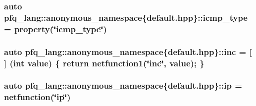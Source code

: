 \hypertarget{namespacepfq__lang_1_1anonymous__namespace_02default_8hpp_03_a4adff7ced08caa2d0016a911dae6d2ed}{
\subsubsection[{icmp\+\_\+type}]{\setlength{\rightskip}{0pt plus 5cm}auto pfq\+\_\+lang\+::anonymous\+\_\+namespace\{default.\+hpp\}\+::icmp\+\_\+type = {\bf property}(\char`\"{}icmp\+\_\+type\char`\"{})}}\label{namespacepfq__lang_1_1anonymous__namespace_02default_8hpp_03_a4adff7ced08caa2d0016a911dae6d2ed}
\hypertarget{namespacepfq__lang_1_1anonymous__namespace_02default_8hpp_03_a14246183085ec07f08ab9b0d53907ae5}{
\subsubsection[{inc}]{\setlength{\rightskip}{0pt plus 5cm}auto pfq\+\_\+lang\+::anonymous\+\_\+namespace\{default.\+hpp\}\+::inc = \mbox{[}$\,$\mbox{]} (int value) \{ return {\bf netfunction1}(\char`\"{}inc\char`\"{}, value); \}}}\label{namespacepfq__lang_1_1anonymous__namespace_02default_8hpp_03_a14246183085ec07f08ab9b0d53907ae5}
\hypertarget{namespacepfq__lang_1_1anonymous__namespace_02default_8hpp_03_a27d30e7744c84a7cdc41a710ee16b885}{
\subsubsection[{ip}]{\setlength{\rightskip}{0pt plus 5cm}auto pfq\+\_\+lang\+::anonymous\+\_\+namespace\{default.\+hpp\}\+::ip = {\bf netfunction}(\char`\"{}ip\char`\"{})}}\label{namespacepfq__lang_1_1anonymous__namespace_02default_8hpp_03_a27d30e7744c84a7cdc41a710ee16b885}
